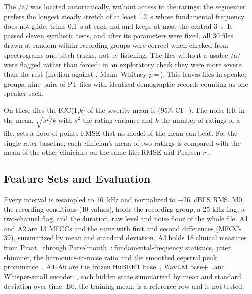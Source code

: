 \documentclass[journal]{IEEEtran}
\begin{document}
The /a/ was located automatically, without access to the ratings: the segmenter prefers the longest steady stretch of at least 1.2~s whose fundamental frequency does not glide, trims 0.1~s at each end and keeps at most the central 3~s. It passed eleven synthetic tests, and after its parameters were fixed, all 30 files drawn at random within recording groups were correct when checked from spectrograms and pitch tracks, not by listening. The \filesNoA{} files without a usable /a/ were flagged rather than forced; in an exploratory check they were more severe than the rest (median \efivejMissingMedian{} against \efivejPrimaryMedian{}, Mann--Whitney $p$\,=\,\efivejP{}). This leaves \filesPrimary{} files in \cvGroups{} speaker groups, nine pairs of PT files with identical demographic records counting as one speaker each.

On these files the ICC(1,$k$) of the severity mean is \icck{} (95\% CI \icckLow{}--\icckHigh{}). The noise left in the mean, $\sqrt{\overline{s^2/k}}$ with $s^2$ the rating variance and $k$ the number of ratings of a file, sets a floor of \noiseFloor{} points RMSE that no model of the mean can beat. For the single-rater baseline, each clinician's mean of two ratings is compared with the mean of the other clinicians on the same file: RMSE \oneRaterRmse{} and Pearson $r$ \oneRaterR{}.

\subsection{Feature Sets and Evaluation}
Every interval is resampled to 16~kHz and normalized to $-26$~dBFS RMS. M0, the recording conditions (10 values), holds the recording group, a 25-kHz flag, a two-channel flag, and the duration, raw level and noise floor of the whole file. A1 and A2 are 13 MFCCs and the same with first and second differences (MFCC-39), summarized by mean and standard deviation. A3 holds 18 clinical measures from Praat~\cite{boersma2020praat} through Parselmouth~\cite{jadoul2018parselmouth}: fundamental-frequency statistics, jitter, shimmer, the harmonics-to-noise ratio and the smoothed cepstral peak prominence~\cite{maryn2015objective}. A4--A6 are the frozen HuBERT base~\cite{hsu2021hubert}, WavLM base+~\cite{chen2022wavlm} and Whisper-small encoder~\cite{radford2023whisper}, each hidden state summarized by mean and standard deviation over time. B0, the training mean, is a reference row and is not tested.
\end{document}

